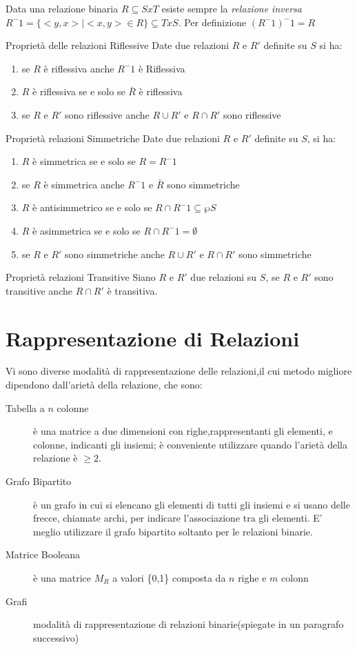 Data una relazione binaria $R \subseteq S x T$ esiste sempre la \emph{relazione inversa}
$R^-1 = \{<y,x> | <x,y> \in R\} \subseteq T x S$.
Per definizione $(R ^ -1) ^ -1 = R$

Proprietà delle relazioni Riflessive
Date due relazioni $R$ e $R'$ definite su $S$ si ha:
\begin{enumerate}
    \item se $R$ è riflessiva anche $R^-1$ è Riflessiva
    \item $R$ è riflessiva se e solo se $\bar{R}$ è riflessiva
    \item se $R$ e $R'$ sono riflessive anche $R \cup R'$ e $R \cap R'$ sono riflessive
\end{enumerate}

Proprietà relazioni Simmetriche
Date due relazioni $R$ e $R'$ definite su $S$, si ha:
\begin{enumerate}
    \item $R$ è simmetrica se e solo se $R = R^-1$
    \item se $R$ è simmetrica anche $R^-1$ e $\bar{R}$ sono simmetriche
    \item $R$ è antisimmetrico se e solo se $R \cap R^-1 \subseteq \wp S$
    \item $R$ è asimmetrica se e solo se $R \cap R^-1 = \emptyset$
    \item se $R$ e $R'$ sono simmetriche anche $R \cup R'$ e $R \cap R'$ sono simmetriche
\end{enumerate}

Proprietà relazioni Transitive
Siano $R$ e $R'$ due relazioni su $S$, se $R$ e $R'$ sono transitive anche $R \cap R'$ è transitiva.

\section{Rappresentazione di Relazioni}
Vi sono diverse modalità di rappresentazione delle relazioni,il cui metodo migliore
dipendono dall'arietà della relazione, che sono:
\begin{description}
    \item[Tabella a $n$ colonne] è una matrice a due dimensioni con righe,rappresentanti
          gli elementi, e colonne, indicanti gli insiemi; è conveniente utilizzare
          quando l'arietà della relazione è $\geq 2$.
    \item[Grafo Bipartito] è un grafo in cui si elencano gli elementi di tutti gli insiemi
         e si usano delle frecce, chiamate archi, per indicare l'associazione tra gli elementi.
         E' meglio utilizzare il grafo bipartito soltanto per le relazioni binarie.
    \item[Matrice Booleana] è una matrice $M_R$ a valori \{0,1\} composta da $n$ righe e $m$ colonn
    \item[Grafi] modalità di rappresentazione di relazioni binarie(spiegate in un paragrafo successivo)
\end{description}

